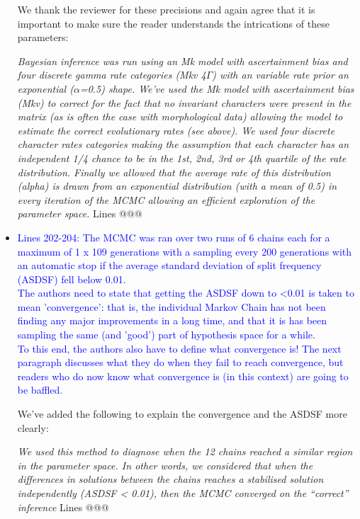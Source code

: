 \documentclass[12pt,letterpaper]{article}
\begin{document}
\begin{itemize}
We thank the reviewer for these precisions and again agree that it is important to make sure the reader understands the intrications of these parameters:

\textit{Bayesian inference was run using an Mk model with ascertainment bias and four discrete gamma rate categories (Mkv 4$\Gamma$) with an variable rate prior an exponential ($\alpha$=0.5) shape. We've used the Mk model with ascertainment bias (Mkv) to correct for the fact that no invariant characters were present in the matrix (as is often the case with morphological data) allowing the model to estimate the correct evolutionary rates (see above). We used four discrete character rates categories making the assumption that each character has an independent 1/4 chance to be in the 1st, 2nd, 3rd or 4th quartile of the rate distribution. Finally we allowed that the average rate of this distribution (alpha) is drawn from an exponential distribution (with a mean of 0.5) in every iteration of the MCMC allowing an efficient exploration of the parameter space.} Lines @@@



\item{\textcolor{blue}{Lines 202-204: The MCMC was ran over two runs of 6 chains each for a maximum of 1 x 109 generations with a sampling every 200 generations with an automatic stop if the average standard deviation of split frequency (ASDSF) fell below 0.01.
\\
The authors need to state that getting the ASDSF down to <0.01 is taken to mean 'convergence': that is, the individual Markov Chain has not been finding any major improvements in a long time, and that it is has been sampling the same (and 'good') part of hypothesis space for a while.
\\
To this end, the authors also have to define what convergence is! The next paragraph discusses what they do when they fail to reach convergence, but readers who do now know what convergence is (in this context) are going to be baffled.}}

We've added the following to explain the convergence and the ASDSF more clearly:

\textit{We used this method to diagnose when the 12 chains reached a similar region in the parameter space. In other words, we considered that when the differences in solutions between the chains reaches a stabilised solution independently (ASDSF < 0.01), then the MCMC converged on the “correct” inference} Lines @@@




\end{itemize}
\end{document}
